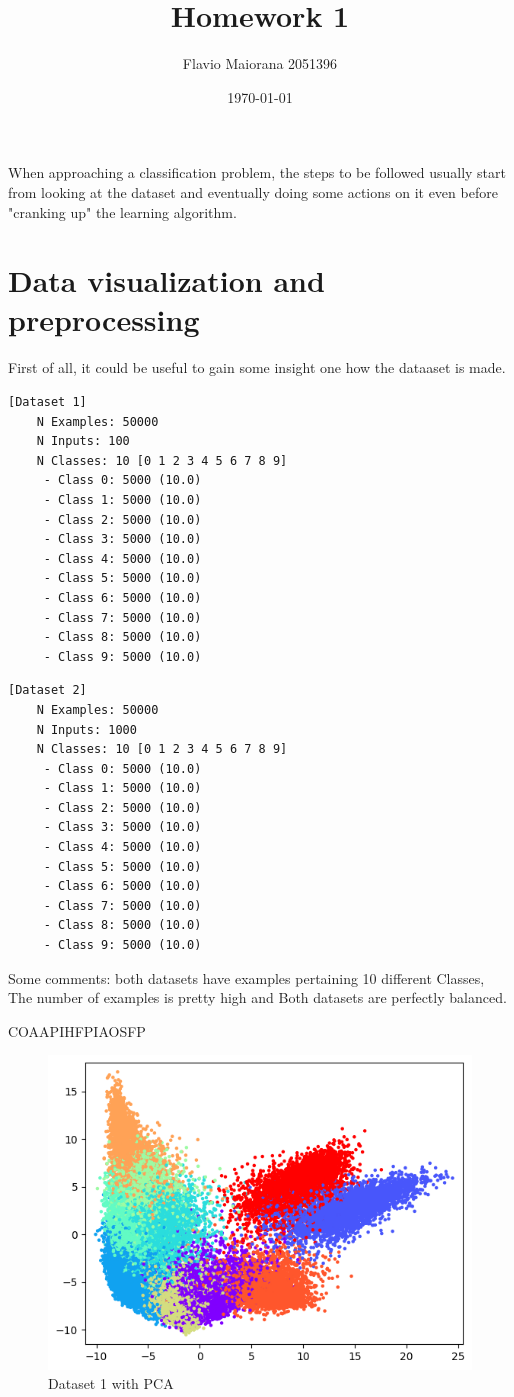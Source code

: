\documentclass[12pt,a4paper,oneside]{article}
\title{Homework 1}	                                    %
\author{Flavio Maiorana 2051396}				                %
\date{\today}								    %
\begin{document}

\newpage

When approaching a classification problem, the steps to be followed
usually start from looking at the dataset and eventually doing some actions on
it even before "cranking up" the learning algorithm.

\section{Data visualization and preprocessing}

First of all, it could be useful to gain some insight one how the dataaset is
made.

\begin{verbatim}[Dataset 1]
    N Examples: 50000
    N Inputs: 100
    N Classes: 10 [0 1 2 3 4 5 6 7 8 9]
     - Class 0: 5000 (10.0)
     - Class 1: 5000 (10.0)
     - Class 2: 5000 (10.0)
     - Class 3: 5000 (10.0)
     - Class 4: 5000 (10.0)
     - Class 5: 5000 (10.0)
     - Class 6: 5000 (10.0)
     - Class 7: 5000 (10.0)
     - Class 8: 5000 (10.0)
     - Class 9: 5000 (10.0)
\end{verbatim}

\begin{verbatim}[Dataset 2]
    N Examples: 50000
    N Inputs: 1000
    N Classes: 10 [0 1 2 3 4 5 6 7 8 9]
     - Class 0: 5000 (10.0)
     - Class 1: 5000 (10.0)
     - Class 2: 5000 (10.0)
     - Class 3: 5000 (10.0)
     - Class 4: 5000 (10.0)
     - Class 5: 5000 (10.0)
     - Class 6: 5000 (10.0)
     - Class 7: 5000 (10.0)
     - Class 8: 5000 (10.0)
     - Class 9: 5000 (10.0)
\end{verbatim}

Some comments: both datasets have examples pertaining 10 different Classes, The
number of examples is pretty high and Both datasets are perfectly balanced.


COAAPIHFPIAOSFP

\begin{figure}[H]
    \includegraphics{figures/dataset1.png}
    \caption{Dataset 1 with PCA}
\end{figure}
\end{document}
